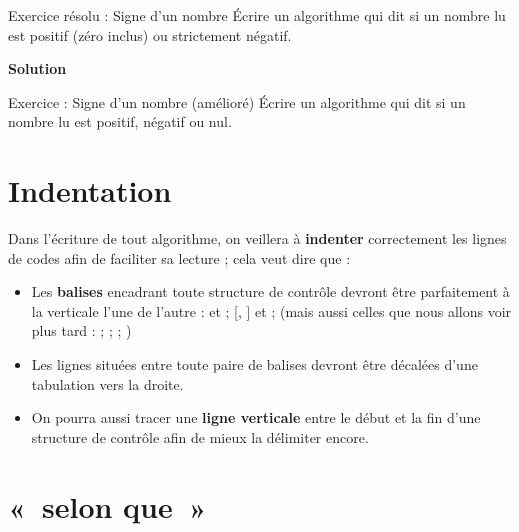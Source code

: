 \begin{Emphase}{Exercice résolu : Signe d'un nombre}
Écrire un algorithme qui dit si un nombre lu est positif (zéro inclus)
ou strictement négatif.

{\bfseries Solution}

\end{Emphase}

\begin{Emphase}{Exercice : Signe d'un nombre (amélioré)}
Écrire un algorithme qui dit si un nombre lu est positif, négatif ou
nul.
\end{Emphase}

\section{Indentation}

Dans l’écriture de tout algorithme, on veillera à \textbf{indenter}
correctement les lignes de codes afin de faciliter sa lecture ; cela
veut dire que :

\begin{itemize}
\item {
Les \textbf{balises} encadrant toute structure de contrôle devront être
parfaitement à la verticale l’une de l’autre : 
et  ; 
[, ] et 
; (mais aussi celles que nous allons voir plus tard
:  ; 
; 
 
; )}
\item {
Les lignes situées entre toute paire de balises devront être décalées
d'une tabulation vers la droite.}
\item {
On pourra aussi tracer une \textbf{ligne verticale} entre le début et la
fin d'une structure de contrôle afin de mieux la
délimiter encore. }
\end{itemize}

\section{«~selon que~»}

